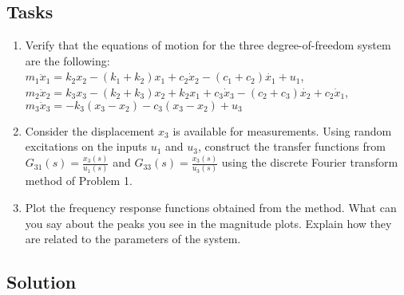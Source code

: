 \documentclass{article}
\begin{document}
\subsection{Tasks}

\begin{enumerate}
    \item Verify that the equations of motion for the three degree-of-freedom system are the following:
    \\$m_1\ddot{x}_1=k_2x_2-(k_1+k_2)x_1+c_2\dot{x}_2-(c_1+c_2)\dot{x_1}+u_1$, \\$m_2\ddot{x}_2=k_3x_3 -(k_2+k_3)x_2+k_2x_1+c_3\dot{x}_3-(c_2+c_3)\dot{x_2}+c_2\dot{x}_1$, \\ $m_3\ddot{x}_3=-k_3(x_3-x_2)-c_3(x_3-x_2)+u_3$

    \item Consider the displacement $x_3$ is available for measurements. Using random excitations on the inputs $u_1$ and $u_3$, construct the transfer functions from $G_{31}(s)=\frac{x_3(s)}{u_1(s)}$ and $G_{33}(s)=\frac{x_3(s)}{u_3(s)}$ using the discrete Fourier transform method of Problem 1.

    \item Plot the frequency response functions obtained from the method. What can you say about the peaks you see in the magnitude plots. Explain how they are related to the parameters of the system.
\end{enumerate}

\subsection{Solution}
\end{document}
